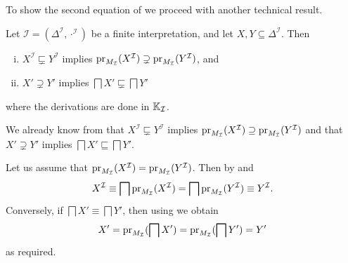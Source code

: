 To show the second equation of  we proceed with another technical result.

\begin{Proposition}
  \label{prop:non-equivalence-implies-non-equality-and-vv}
  Let $\mathcal{I} = (\Delta^{\mathcal{I}}, \cdot^{\mathcal{I}})$ be a finite
  interpretation, and let $X, Y \subseteq \Delta^{\mathcal{I}}$.  Then
  \begin{enumerate}[i. ]
  \item $X^{\mathcal{I}} \sqsubsetneq Y^{\mathcal{I}}$ implies
    $\operatorname{pr}_{M_{\mathcal{I}}}(X^{\mathcal{I}}) \supsetneq
    \operatorname{pr}_{M_{\mathcal{I}}}(Y^{\mathcal{I}})$, and
  \item $X' \supsetneq Y'$ implies $\bigsqcap X' \sqsubsetneq \bigsqcap Y'$
  \end{enumerate}
  where the derivations are done in ${\mathbb{K}}_{\mathcal{I}}$.
\end{Proposition}
\begin{Proof}
  We already know from  that $X^{\mathcal{I}} \sqsubsetneq
  Y^{\mathcal{I}}$ implies $\operatorname{pr}_{M_{\mathcal{I}}}(X^{\mathcal{I}}) \supseteq
  \operatorname{pr}_{M_{\mathcal{I}}}(Y^{\mathcal{I}})$ and that $X' \supsetneq Y'$ implies $\bigsqcap
  X' \sqsubseteq \bigsqcap Y'$.

  Let us assume that $\operatorname{pr}_{M_{\mathcal{I}}}(X^{\mathcal{I}}) =
  \operatorname{pr}_{M_{\mathcal{I}}}(Y^{\mathcal{I}})$.  Then by
   and
  \begin{equation*}
    X^{\mathcal{I}} \equiv \bigsqcap \operatorname{pr}_{M_{\mathcal{I}}}(X^{\mathcal{I}}) = \bigsqcap
    \operatorname{pr}_{M_{\mathcal{I}}}(Y^{\mathcal{I}}) \equiv Y^{\mathcal{I}}.
  \end{equation*}
  Conversely, if $\bigsqcap X' \equiv \bigsqcap Y'$, then using
   we obtain
  \begin{equation*}
    X' = \operatorname{pr}_{M_{\mathcal{I}}}(\bigsqcap X') = \operatorname{pr}_{M_{\mathcal{I}}}(\bigsqcap Y') = Y'
  \end{equation*}
  as required.
\end{Proof}


